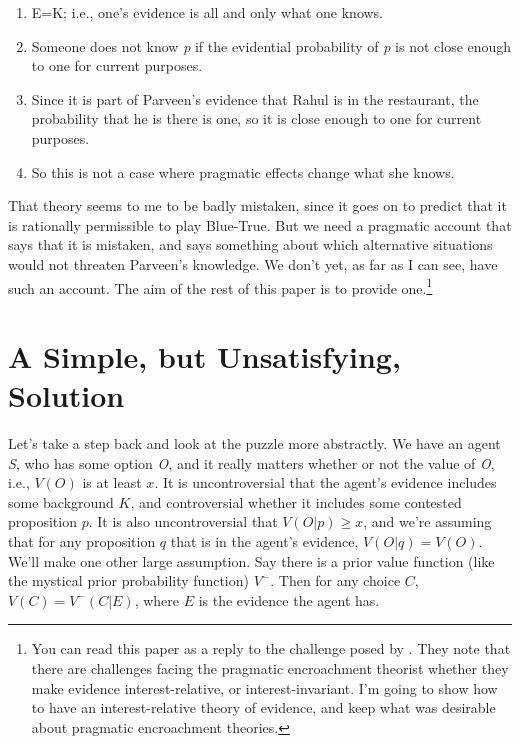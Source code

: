 \begin{enumerate}
\item E=K; i.e., one's evidence is all and only what one knows.

\item Someone does not know \emph{p} if the evidential probability of \emph{p} is not close enough to one for current purposes.

\item Since it is part of Parveen's evidence that Rahul is in the restaurant, the probability that he is there is one, so it is close enough to one for current purposes.

\item So this is not a case where pragmatic effects change what she knows.

\end{enumerate}
That theory seems to me to be badly mistaken, since it goes on to predict that it is rationally permissible to play Blue-True. But we need a pragmatic account that says that it is mistaken, and says something about which alternative situations would not threaten Parveen's knowledge. We don't yet, as far as I can see, have such an account. The aim of the rest of this paper is to provide one.\footnote{You can read this paper as a reply to the challenge posed by  \citet{IchikawaEtAl2012}. They note that there are challenges facing the pragmatic encroachment theorist whether they make evidence interest-relative, or interest-invariant. I'm going to show how to have an interest-relative theory of evidence, and keep what was desirable about pragmatic encroachment theories.}

\section{A Simple, but Unsatisfying, Solution}
\label{asimplebutunsatisfyingsolution}

Let's take a step back and look at the puzzle more abstractly. We have an agent \emph{S}, who has some option \emph{O}, and it really matters whether or not the value of \emph{O}, i.e., $V(O)$ is at least $x$. It is uncontroversial that the agent's evidence includes some background $K$, and controversial whether it includes some contested proposition $p$. It is also uncontroversial that $V(O | p) \geq x$, and we're assuming that for any proposition $q$ that is in the agent's evidence, $V(O | q) = V(O)$. We'll make one other large assumption. Say there is a prior value function (like the mystical prior probability function) $V^-$. Then for any choice $C$, $V(C) = V^-(C | E)$, where $E$ is the evidence the agent has.

